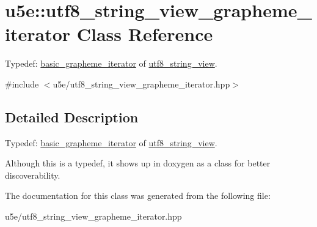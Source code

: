 \hypertarget{classu5e_1_1utf8__string__view__grapheme__iterator}{}\section{u5e\+:\+:utf8\+\_\+string\+\_\+view\+\_\+grapheme\+\_\+iterator Class Reference}
\label{classu5e_1_1utf8__string__view__grapheme__iterator}


Typedef\+: \hyperlink{classu5e_1_1basic__grapheme__iterator}{basic\+\_\+grapheme\+\_\+iterator} of \hyperlink{classu5e_1_1utf8__string__view}{utf8\+\_\+string\+\_\+view}.  




{\ttfamily \#include $<$u5e/utf8\+\_\+string\+\_\+view\+\_\+grapheme\+\_\+iterator.\+hpp$>$}



\subsection{Detailed Description}
Typedef\+: \hyperlink{classu5e_1_1basic__grapheme__iterator}{basic\+\_\+grapheme\+\_\+iterator} of \hyperlink{classu5e_1_1utf8__string__view}{utf8\+\_\+string\+\_\+view}. 

Although this is a typedef, it shows up in doxygen as a class for better discoverability. 

The documentation for this class was generated from the following file\+:\begin{DoxyCompactItemize}
\item 
u5e/utf8\+\_\+string\+\_\+view\+\_\+grapheme\+\_\+iterator.\+hpp\end{DoxyCompactItemize}
